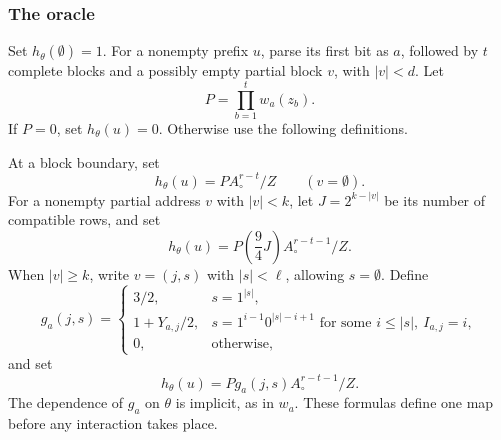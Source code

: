 \subsubsection{The oracle}

Set $h_\theta(\emptyset)=1$. For a nonempty prefix $u$, parse its first bit as $a$, followed by $t$ complete blocks and a possibly empty partial block $v$, with $|v|<d$. Let
\[
P=\prod_{b=1}^t w_a(z_b).
\]
If $P=0$, set $h_\theta(u)=0$. Otherwise use the following definitions.

At a block boundary, set
\begin{equation}\label{pw-eq:h-boundary}
h_\theta(u)=P A_\circ^{r-t}/Z\qquad(v=\emptyset).
\end{equation}
For a nonempty partial address $v$ with $|v|<k$, let $J=2^{k-|v|}$ be its number of compatible rows, and set
\begin{equation}\label{pw-eq:h-address}
h_\theta(u)=P\left(\frac94J\right)A_\circ^{r-t-1}/Z.
\end{equation}
When $|v|\ge k$, write $v=(j,s)$ with $|s|<\ell$, allowing $s=\emptyset$. Define
\begin{equation}\label{pw-eq:local}
g_a(j,s)=
\begin{cases}
3/2,&s=1^{|s|},\\
1+Y_{a,j}/2,&s=1^{i-1}0^{|s|-i+1}\text{ for some }i\le|s|,\ I_{a,j}=i,\\
0,&\text{otherwise},
\end{cases}
\end{equation}
and set
\begin{equation}\label{pw-eq:h-comb}
h_\theta(u)=P g_a(j,s)A_\circ^{r-t-1}/Z.
\end{equation}
The dependence of $g_a$ on $\theta$ is implicit, as in $w_a$. These formulas define one map before any interaction takes place.

